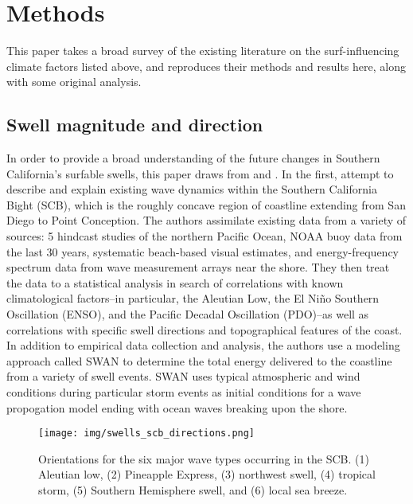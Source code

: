 \documentclass[12pt, letterpaper]{article}
\begin{document}
	\section{Methods}
	This paper takes a broad survey of the existing literature on the surf-influencing climate factors listed above, and reproduces their methods and results here, along with some original analysis. 

	\subsection{Swell magnitude and direction}
	In order to provide a broad understanding of the future changes in Southern California's surfable swells, this paper draws from \citet{swells-deep-water-waves} and \citet{swells-aleutian-low}. In the first, \citeauthor{swells-deep-water-waves} attempt to describe and explain existing wave dynamics within the Southern California Bight (SCB), which is the roughly concave region of coastline extending from San Diego to Point Conception. The authors assimilate existing data from a variety of sources: 5 hindcast studies of the northern Pacific Ocean, NOAA buoy data from the last 30 years, systematic beach-based visual estimates, and energy-frequency spectrum data from wave measurement arrays near the shore. They then treat the data to a statistical analysis in search of correlations with known climatological factors--in particular, the Aleutian Low, the El Ni\~{n}o Southern Oscillation (ENSO), and the Pacific Decadal Oscillation (PDO)--as well as correlations with specific swell directions and topographical features of the coast. In addition to empirical data collection and analysis, the authors use a modeling approach called SWAN to determine the total energy delivered to the coastline from a variety of swell events. SWAN uses typical atmospheric and wind conditions during particular storm events as initial conditions for a wave propogation model ending with ocean waves breaking upon the shore. \citep{swells-deep-water-waves}

	\begin{figure}[h]
		\centering
		\texttt{[image: img/swells\_scb\_directions.png]}
		\caption{Orientations for the six major wave types occurring in the SCB. (1) Aleutian low, (2) Pineapple Express, (3) northwest swell, (4) tropical storm, (5) Southern Hemisphere swell, and (6) local sea breeze.\citep{swells-deep-water-waves}}
		\label{fig:swell_direction}
	\end{figure}
\end{document}
